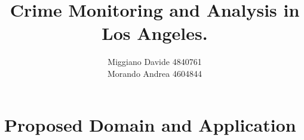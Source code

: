 \author{Miggiano Davide 4840761\\ Morando Andrea 4604844}
\date{}



\title{Crime Monitoring and Analysis in Los Angeles.}
\maketitle

\section{Proposed Domain and Application}
